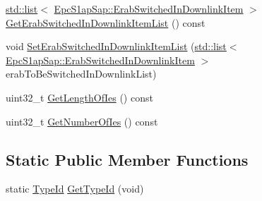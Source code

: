 \begin{DoxyCompactItemize}
\item 
\hyperlink{openflow-interface_8h_afd9bcfa176617760671b67580f536fa7}{std\+::list}$<$ \hyperlink{structns3_1_1EpcS1apSap_1_1ErabSwitchedInDownlinkItem}{Epc\+S1ap\+Sap\+::\+Erab\+Switched\+In\+Downlink\+Item} $>$ \hyperlink{classns3_1_1EpcS1APPathSwitchRequestHeader_aa82b68811f1a742b963fa5a5473fb1f0}{Get\+Erab\+Switched\+In\+Downlink\+Item\+List} () const 
\item 
void \hyperlink{classns3_1_1EpcS1APPathSwitchRequestHeader_abe45c878072527c235adb652a1ff5c67}{Set\+Erab\+Switched\+In\+Downlink\+Item\+List} (\hyperlink{openflow-interface_8h_afd9bcfa176617760671b67580f536fa7}{std\+::list}$<$ \hyperlink{structns3_1_1EpcS1apSap_1_1ErabSwitchedInDownlinkItem}{Epc\+S1ap\+Sap\+::\+Erab\+Switched\+In\+Downlink\+Item} $>$ erab\+To\+Be\+Switched\+In\+Downlink\+List)
\item 
uint32\+\_\+t \hyperlink{classns3_1_1EpcS1APPathSwitchRequestHeader_ac6294d210aa649508e224d06ca16d80c}{Get\+Length\+Of\+Ies} () const 
\item 
uint32\+\_\+t \hyperlink{classns3_1_1EpcS1APPathSwitchRequestHeader_a55efdb1bcff5059a52c6633863a05419}{Get\+Number\+Of\+Ies} () const 
\end{DoxyCompactItemize}
\subsection*{Static Public Member Functions}
\begin{DoxyCompactItemize}
\item 
static \hyperlink{classns3_1_1TypeId}{Type\+Id} \hyperlink{classns3_1_1EpcS1APPathSwitchRequestHeader_ab997068b3f0f8bbd92779977a670d451}{Get\+Type\+Id} (void)
\end{DoxyCompactItemize}
